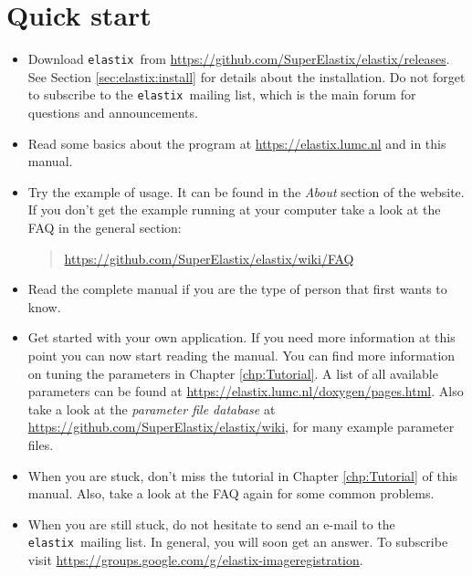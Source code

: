 \documentclass[]{report}
\newcommand{\elastix}{\texttt{elastix}}
\begin{document}

\section{Quick start}

\begin{itemize}
\item Download \elastix\ from \url{https://github.com/SuperElastix/elastix/releases}.
    See Section \ref{sec:elastix:install} for details about the
    installation. Do not forget to subscribe to the \elastix\ mailing list,
    which is the main forum for questions and announcements.

\item Read some basics about the program at
    \url{https://elastix.lumc.nl} and in this manual.

\item Try the example of usage. It can be found in the \emph{About}
section of the website. If you don't get the example running at your
computer take a look at the FAQ in the general section:
\begin{quote}
\url{https://github.com/SuperElastix/elastix/wiki/FAQ}
\end{quote}

\item Read the complete manual if you are the type of person that
first wants to know.

\item Get started with your own application. If you need more information
    at this point you can now start reading the manual. You can find more
    information on tuning the parameters in Chapter \ref{chp:Tutorial}. A
    list of all available parameters can be found at
    \url{https://elastix.lumc.nl/doxygen/pages.html}. Also take a look at
    the \emph{parameter file database} at
    \url{https://github.com/SuperElastix/elastix/wiki}, for many example parameter
    files.

\item When you are stuck, don't miss the tutorial in Chapter
\ref{chp:Tutorial} of this manual. Also, take a look at the FAQ again
for some common problems.

\item When you are still stuck, do not hesitate to send an e-mail to the
    \elastix\ mailing list. In general, you will soon get an answer.
    To subscribe visit
    \url{https://groups.google.com/g/elastix-imageregistration}.
\end{itemize}
\end{document}
